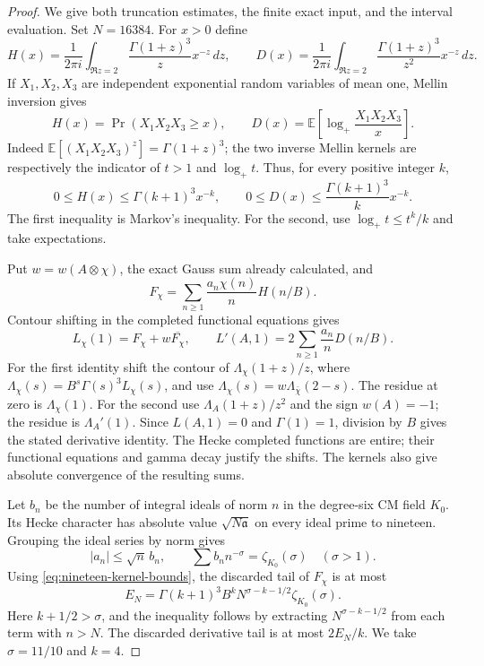\begin{proof}
We give both truncation estimates, the finite exact input, and the
interval evaluation. Set $N=16384$. For $x>0$ define
\[
 H(x)=\frac1{2\pi i}\int_{\Re z=2}
          \frac{\Gamma(1+z)^3}{z}x^{-z}\,dz,
 \qquad
 D(x)=\frac1{2\pi i}\int_{\Re z=2}
          \frac{\Gamma(1+z)^3}{z^2}x^{-z}\,dz.
\]
If $X_1,X_2,X_3$ are independent exponential random variables of
mean one, Mellin inversion gives
\[
 H(x)=\Pr(X_1X_2X_3\geq x),\qquad
 D(x)=\mathbb E\!\left[\log_+\frac{X_1X_2X_3}{x}\right].
\]
Indeed $\mathbb E[(X_1X_2X_3)^z]=\Gamma(1+z)^3$;
the two inverse Mellin kernels are respectively the indicator of
$t>1$ and $\log_+t$. Thus, for every positive integer $k$,
\begin{equation}\label{eq:nineteen-kernel-bounds}
 0\leq H(x)\leq\Gamma(k+1)^3x^{-k},\qquad
 0\leq D(x)\leq\frac{\Gamma(k+1)^3}{k}x^{-k}.
\end{equation}
The first inequality is Markov's inequality. For the second, use
$\log_+t\leq t^k/k$ and take expectations.

Put $w=w(A\otimes\chi)$, the exact Gauss sum already calculated,
and
\[
 F_\chi=\sum_{n\geq1}\frac{a_n\chi(n)}n H(n/B).
\]
Contour shifting in the completed functional equations gives
\begin{equation}\label{eq:nineteen-central-sums}
 L_\chi(1)=F_\chi+w\overline{F_\chi},\qquad
 L'(A,1)=2\sum_{n\geq1}\frac{a_n}{n}D(n/B).
\end{equation}
For the first identity shift the contour of
$\Lambda_\chi(1+z)/z$, where
$\Lambda_\chi(s)=B^s\Gamma(s)^3L_\chi(s)$, and use
$\Lambda_\chi(s)=w\Lambda_{\bar\chi}(2-s)$.
The residue at zero is $\Lambda_\chi(1)$.
For the second use $\Lambda_A(1+z)/z^2$ and the sign
$w(A)=-1$; the residue is $\Lambda_A'(1)$.
Since $L(A,1)=0$ and $\Gamma(1)=1$, division by $B$
gives the stated derivative identity. The Hecke completed functions
are entire; their functional equations and gamma decay justify
the shifts. The kernels also give absolute convergence of the
resulting sums.

Let $b_n$ be the number of integral ideals of norm $n$ in the
degree-six CM field $K_0$. Its Hecke character has absolute value
$\sqrt{N\mathfrak a}$ on every ideal prime to nineteen. Grouping
the ideal series by norm gives
\[
 |a_n|\leq\sqrt n\,b_n,
 \qquad \sum b_n n^{-\sigma}=\zeta_{K_0}(\sigma)
 \quad(\sigma>1).
\]
Using \eqref{eq:nineteen-kernel-bounds}, the discarded tail of
$F_\chi$ is at most
\begin{equation}\label{eq:nineteen-coefficient-tail}
 E_N=\Gamma(k+1)^3B^k
       N^{\sigma-k-1/2}\zeta_{K_0}(\sigma).
\end{equation}
Here $k+1/2>\sigma$, and the inequality follows by extracting
$N^{\sigma-k-1/2}$ from each term with $n>N$.
The discarded derivative tail is at most $2E_N/k$.
We take $\sigma=11/10$ and $k=4$.


\end{proof}
